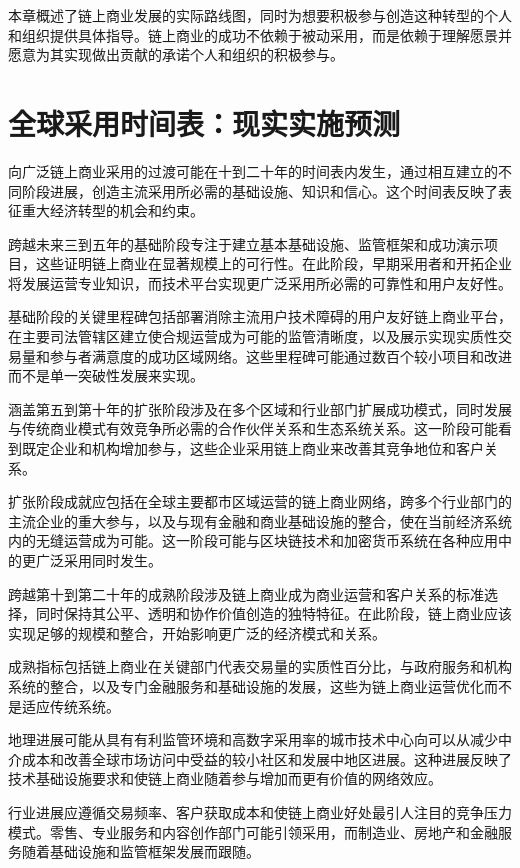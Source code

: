 \documentclass[
  Letterpaper,
]{scrbook}
\begin{document}
本章概述了链上商业发展的实际路线图，同时为想要积极参与创造这种转型的个人和组织提供具体指导。链上商业的成功不依赖于被动采用，而是依赖于理解愿景并愿意为其实现做出贡献的承诺个人和组织的积极参与。

\section{全球采用时间表：现实实施预测}\label{ux5168ux7403ux91c7ux7528ux65f6ux95f4ux8868ux73b0ux5b9eux5b9eux65bdux9884ux6d4b}

向广泛链上商业采用的过渡可能在十到二十年的时间表内发生，通过相互建立的不同阶段进展，创造主流采用所必需的基础设施、知识和信心。这个时间表反映了表征重大经济转型的机会和约束。

跨越未来三到五年的基础阶段专注于建立基本基础设施、监管框架和成功演示项目，这些证明链上商业在显著规模上的可行性。在此阶段，早期采用者和开拓企业将发展运营专业知识，而技术平台实现更广泛采用所必需的可靠性和用户友好性。

基础阶段的关键里程碑包括部署消除主流用户技术障碍的用户友好链上商业平台，在主要司法管辖区建立使合规运营成为可能的监管清晰度，以及展示实现实质性交易量和参与者满意度的成功区域网络。这些里程碑可能通过数百个较小项目和改进而不是单一突破性发展来实现。

涵盖第五到第十年的扩张阶段涉及在多个区域和行业部门扩展成功模式，同时发展与传统商业模式有效竞争所必需的合作伙伴关系和生态系统关系。这一阶段可能看到既定企业和机构增加参与，这些企业采用链上商业来改善其竞争地位和客户关系。

扩张阶段成就应包括在全球主要都市区域运营的链上商业网络，跨多个行业部门的主流企业的重大参与，以及与现有金融和商业基础设施的整合，使在当前经济系统内的无缝运营成为可能。这一阶段可能与区块链技术和加密货币系统在各种应用中的更广泛采用同时发生。

跨越第十到第二十年的成熟阶段涉及链上商业成为商业运营和客户关系的标准选择，同时保持其公平、透明和协作价值创造的独特特征。在此阶段，链上商业应该实现足够的规模和整合，开始影响更广泛的经济模式和关系。

成熟指标包括链上商业在关键部门代表交易量的实质性百分比，与政府服务和机构系统的整合，以及专门金融服务和基础设施的发展，这些为链上商业运营优化而不是适应传统系统。

地理进展可能从具有有利监管环境和高数字采用率的城市技术中心向可以从减少中介成本和改善全球市场访问中受益的较小社区和发展中地区进展。这种进展反映了技术基础设施要求和使链上商业随着参与增加而更有价值的网络效应。

行业进展应遵循交易频率、客户获取成本和使链上商业好处最引人注目的竞争压力模式。零售、专业服务和内容创作部门可能引领采用，而制造业、房地产和金融服务随着基础设施和监管框架发展而跟随。
\end{document}
